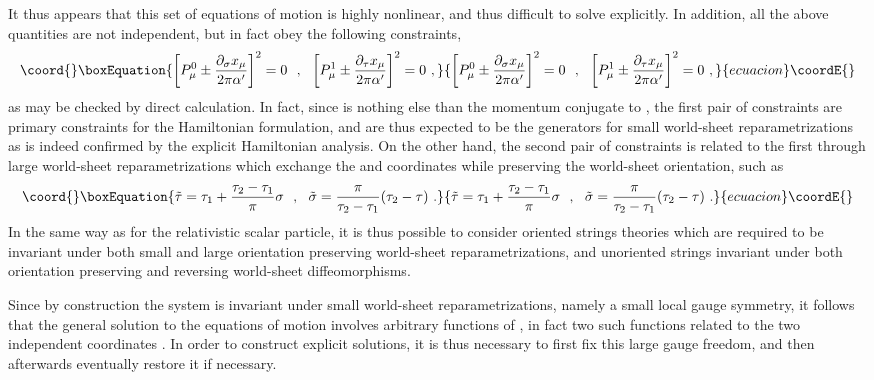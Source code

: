 \documentclass[a4paper,11pt]{article}
\begin{document}
It thus appears that this set of equations of motion is highly nonlinear,
and thus difficult to solve explicitly. In addition, all the above
quantities are not independent, but in fact obey the following constraints,
\begin{equation}\coord{}\boxEquation{
\left[P^0_\mu\pm\frac{\partial_\sigma x_\mu}{2\pi\alpha'}\right]^2=0\ \ ,\ \ 
\left[P^1_\mu\pm\frac{\partial_\tau x_\mu}{2\pi\alpha'}\right]^2=0\ ,
}{
\left[P^0_\mu\pm\frac{\partial_\sigma x_\mu}{2\pi\alpha'}\right]^2=0\ \ ,\ \ 
\left[P^1_\mu\pm\frac{\partial_\tau x_\mu}{2\pi\alpha'}\right]^2=0\ ,
}{ecuacion}\coordE{}\end{equation}
as may be checked by direct calculation. In fact, since \coordHE{} is
nothing else than the momentum conjugate to \coordHE{}, the first pair
of constraints are primary constraints for the Hamiltonian formulation,
and are thus expected to be the generators for small world-sheet
reparametrizations as is indeed confirmed by the explicit Hamiltonian
analysis. On the other hand, the second pair of constraints is related 
to the first through large world-sheet reparametrizations which exchange
the \myHighlight{$\tau$}\coordHE{} and \myHighlight{$\sigma$}\coordHE{} coordinates while preserving the world-sheet
orientation, such as
\begin{equation}\coord{}\boxEquation{
\tilde{\tau}=\tau_1+\frac{\tau_2-\tau_1}{\pi}\sigma\ \ ,\ \ 
\tilde{\sigma}=\frac{\pi}{\tau_2-\tau_1}(\tau_2-\tau)\ .
}{
\tilde{\tau}=\tau_1+\frac{\tau_2-\tau_1}{\pi}\sigma\ \ ,\ \ 
\tilde{\sigma}=\frac{\pi}{\tau_2-\tau_1}(\tau_2-\tau)\ .
}{ecuacion}\coordE{}\end{equation}
In the same way as for the relativistic scalar particle, it is thus possible
to consider oriented strings theories which are required to be invariant
under both small and large orientation preserving 
world-sheet reparametrizations, and unoriented strings invariant under
both orientation preserving and reversing world-sheet diffeomorphisms.

Since by construction the system is invariant under small world-sheet
reparametrizations, namely a small local gauge symmetry, it follows that
the general solution to the equations of motion involves arbitrary
functions of \myHighlight{$\xi^\alpha$}\coordHE{}, in fact two such functions related to the
two independent coordinates \myHighlight{$\xi^\alpha=(\tau,\sigma)$}\coordHE{}. In order
to construct explicit solutions, it is thus necessary to first fix
this large gauge freedom, and then afterwards eventually restore it
if necessary.
\end{document}
